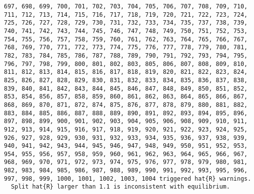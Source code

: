 \documentclass[
  letterpaper,
  DIV=11,
  numbers=noendperiod]{scrartcl}
\begin{document}
\begin{verbatim}
697, 698, 699, 700, 701, 702, 703, 704, 705, 706, 707, 708, 709, 710, 711, 712, 713, 714, 715, 716, 717, 718, 719, 720, 721, 722, 723, 724, 725, 726, 727, 728, 729, 730, 731, 732, 733, 734, 735, 737, 738, 739, 740, 741, 742, 743, 744, 745, 746, 747, 748, 749, 750, 751, 752, 753, 754, 755, 756, 757, 758, 759, 760, 761, 762, 763, 764, 765, 766, 767, 768, 769, 770, 771, 772, 773, 774, 775, 776, 777, 778, 779, 780, 781, 782, 783, 784, 785, 786, 787, 788, 789, 790, 791, 792, 793, 794, 795, 796, 797, 798, 799, 800, 801, 802, 803, 805, 806, 807, 808, 809, 810, 811, 812, 813, 814, 815, 816, 817, 818, 819, 820, 821, 822, 823, 824, 825, 826, 827, 828, 829, 830, 831, 832, 833, 834, 835, 836, 837, 838, 839, 840, 841, 842, 843, 844, 845, 846, 847, 848, 849, 850, 851, 852, 853, 854, 856, 857, 858, 859, 860, 861, 862, 863, 864, 865, 866, 867, 868, 869, 870, 871, 872, 874, 875, 876, 877, 878, 879, 880, 881, 882, 883, 884, 885, 886, 887, 888, 889, 890, 891, 892, 893, 894, 895, 896, 897, 898, 899, 900, 901, 902, 903, 904, 905, 906, 908, 909, 910, 911, 912, 913, 914, 915, 916, 917, 918, 919, 920, 921, 922, 923, 924, 925, 926, 927, 928, 929, 930, 931, 932, 933, 934, 935, 936, 937, 938, 939, 940, 941, 942, 943, 944, 945, 946, 947, 948, 949, 950, 951, 952, 953, 954, 955, 956, 957, 958, 959, 960, 961, 962, 963, 964, 965, 966, 967, 968, 969, 970, 971, 972, 973, 974, 975, 976, 977, 978, 979, 980, 981, 982, 983, 984, 985, 986, 987, 988, 989, 990, 991, 992, 993, 995, 996, 997, 998, 999, 1000, 1001, 1002, 1003, 1004 triggered hat{R} warnings.
  Split hat{R} larger than 1.1 is inconsistent with equilibrium.


\end{verbatim}
\end{document}
